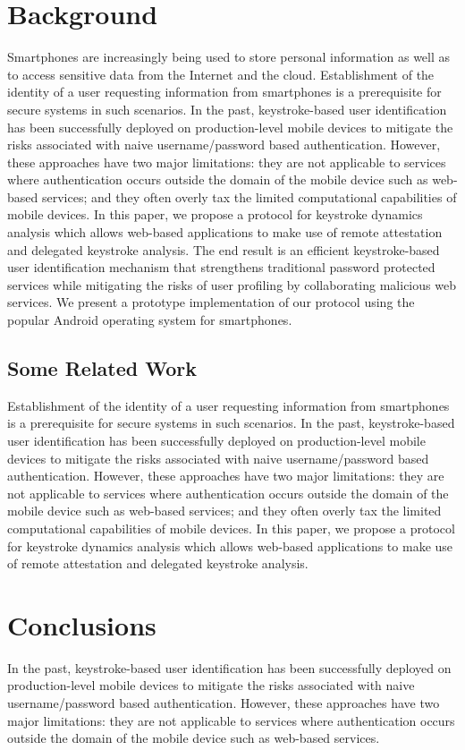 \documentclass[twocolumn]{article}
\begin{document}
\section{Background} 
Smartphones are increasingly being used to store personal information as well as to access sensitive
data from the Internet and the cloud. Establishment of the identity of a user requesting information
from smartphones is a prerequisite for  secure systems in such scenarios. In the past,
keystroke-based user identification has been successfully deployed on production-level mobile
devices to mitigate the risks associated with naive username/password based authentication. However,
these approaches have two major limitations: they are not applicable to services where
authentication occurs outside the domain of the mobile
device such as web-based services; and they often overly tax the limited computational capabilities
of mobile devices. In this paper, we propose a protocol for keystroke dynamics analysis which allows
web-based applications to make use of remote attestation and delegated keystroke analysis. The end
result is an efficient keystroke-based user identification mechanism that strengthens traditional
password protected services while mitigating the risks of user profiling by collaborating malicious
web services. We present a prototype implementation of our protocol using the popular Android
operating system for smartphones.

\subsection{Some Related Work} 
Establishment of the identity of a user requesting information from smartphones is a prerequisite
for  secure systems in such scenarios. In the past, keystroke-based user identification has been
successfully deployed on production-level mobile devices to mitigate the risks associated with naive
username/password based authentication. However, these approaches have two major limitations: they
are not applicable to services where authentication occurs outside the domain of the mobile device
such as web-based services; and they often overly tax the limited computational capabilities of
mobile devices. In this paper, we propose a protocol for keystroke dynamics analysis which allows
web-based applications to make use of remote attestation and delegated keystroke analysis.

\section{Conclusions}
In the past, keystroke-based user identification has been successfully deployed on production-level
mobile devices to mitigate the risks associated with naive username/password based authentication.
However, these approaches have two major limitations: they are not applicable to services where
authentication occurs outside the domain of the mobile device such as web-based services.~\cite{knuth1997art}
\end{document}
